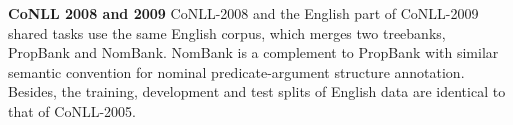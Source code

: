 \documentclass[letterpaper]{article} %
\begin{document}

\noindent \textbf{CoNLL 2008 and 2009} \quad
CoNLL-2008 and the English part of CoNLL-2009 shared tasks use the same English corpus, 
which merges two treebanks, PropBank and NomBank. NomBank is a complement to PropBank with similar semantic convention for nominal predicate-argument structure annotation. Besides, the training, development and test splits of English data are identical to that of CoNLL-2005.
\end{document}
